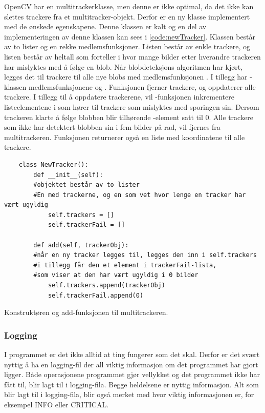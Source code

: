 OpenCV har en multitrackerklasse, men denne er ikke optimal, da det ikke kan slettes trackere fra et multitracker-objekt. 
Derfor er en ny klasse implementert med de ønskede egenskapene. 
Denne klassen er kalt  og en del av implementeringen av denne klassen kan sees i \autoref{code:newTracker}. 
Klassen består av to lister og en rekke medlemsfunksjoner. 
Listen  består av enkle trackere, og listen  består av heltall som forteller i hvor mange bilder etter hverandre trackeren har mislyktes med å følge en blob. 
Når blobdeteksjons algoritmen har kjørt, legges det til trackere til alle nye blobs med medlemsfunksjonen .
I tillegg har -klassen medlemsfunksjonene  og \cite{GitHub}. 
Funksjonen  fjerner trackere, og  oppdaterer alle trackere. 
I tillegg til å oppdatere trackerene, vil -funksjonen inkrementere listeelementene i  som hører til trackere som mislyktes med sporingen sin.
Dersom trackeren klarte å følge blobben blir tilhørende -element satt til $0$. 
Alle trackere som ikke har detektert blobben sin i fem bilder på rad, vil fjernes fra multitrackeren. Funksjonen  returnerer også en liste med koordinatene til alle trackere.

\begin{listing}[!htb]
\begin{verbatim}
    class NewTracker():                     
        def __init__(self):
        #objektet består av to lister
        #En med trackerne, og en som vet hvor lenge en tracker har vært ugyldig
            self.trackers = []             
            self.trackerFail = []
    
        def add(self, trackerObj):
        #når en ny tracker legges til, legges den inn i self.trackers
        #i tillegg får den et element i trackerFail-lista,
        #som viser at den har vært ugyldig i 0 bilder
            self.trackers.append(trackerObj)
            self.trackerFail.append(0)
\end{verbatim}
\caption{Konstruktøren og add-funksjonen til multitrackeren.}
\label{code:newTracker}
\end{listing}


\subsubsection{Logging}\label{sec:impl:programvare:logging}
I programmet  er det ikke alltid at ting fungerer som det skal. %
Derfor er det svært nyttig å ha en logging-fil der all viktig informasjon om det programmet har gjort ligger. 
Både operasjonene programmet gjør vellykket og det programmet ikke har fått til, blir lagt til i logging-fila. 
Begge heldelsene er nyttig informasjon. 
Alt som blir lagt til i logging-fila, blir også merket med hvor viktig informasjonen er, for eksempel INFO eller CRITICAL. 

